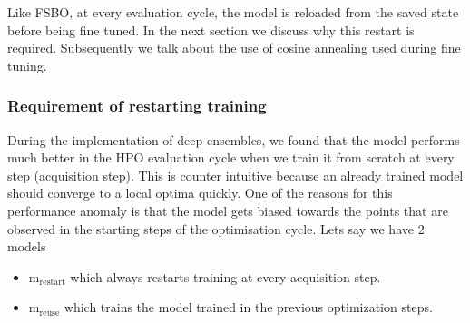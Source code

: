 \documentclass[12pt, twoside, ngerman]{report}
\begin{document}
Like FSBO,  at every evaluation cycle,  the model is reloaded from the saved state before being fine tuned.
In the next section we discuss why this restart is required.
Subsequently we talk about the use of cosine annealing used during fine tuning.

\subsubsection{Requirement of restarting training}\label{sec:restart}

During the implementation of deep ensembles,  we found that the model performs much better in the HPO evaluation cycle when we train it from scratch at every step (acquisition step).
This is counter intuitive because an already trained model should converge to a local optima quickly.
One of the reasons for this performance anomaly is that the model gets biased towards the points that are observed in the starting steps of the optimisation cycle.
Lets say we have 2 models 
\begin{itemize}
\item $\textrm{m}_{\textrm{restart}}$ which always restarts training at every acquisition step.
\item $\textrm{m}_{\textrm{reuse}}$ which trains the model trained in the previous optimization steps.
\end{itemize}
\end{document}
